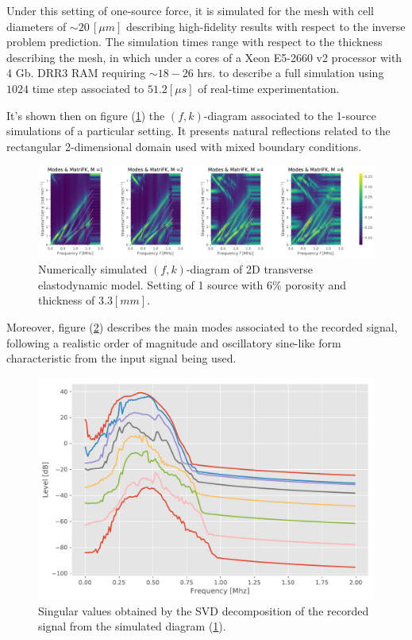 \begin{rem}
Under this setting of one-source force, it is simulated for the mesh with cell diameters of $\sim 20 \, [\mu m]$ describing high-fidelity results with respect to the inverse problem prediction. The simulation times range with respect to the thickness describing the mesh, in which under a cores of a Xeon E5-2660 v2 processor with 4 Gb. DRR3 RAM requiring $\sim 18-26$ hrs. to describe a full simulation using $1024$ time step associated to $51.2 [\mu s]$ of real-time experimentation.
\end{rem}
It's shown then on figure (\ref{FK-DiagramS1P6M33}) the $(f,k)$-diagram associated to the 1-source simulations of a particular setting. It presents natural reflections related to the rectangular 2-dimensional domain used with mixed boundary conditions.
\begin{figure}[!h]
	\centering
	\includegraphics[width=\textwidth]{images/TimeSingSous/2DTime_P6ElasticFK33M1460_y.pdf}
	\caption{Numerically simulated $(f,k)$-diagram of 2D transverse elastodynamic model. Setting of 1 source with $6\%$ porosity and thickness of $3.3 [mm]$.}
	\label{FK-DiagramS1P6M33}
\end{figure}

Moreover, figure (\ref{SVD-S1P6M33}) describes the main modes associated to the recorded signal, following a realistic order of magnitude and oscillatory sine-like form characteristic from the input signal being used.
\begin{figure}[!h]
	\centering
	\includegraphics[scale=.5]{images/TimeSingSous/2DTime_P6Elastic33_SV.pdf}
	\caption{Singular values obtained by the SVD decomposition of the recorded signal from the simulated diagram (\ref{FK-DiagramS1P6M33}).}
	\label{SVD-S1P6M33}
\end{figure}

